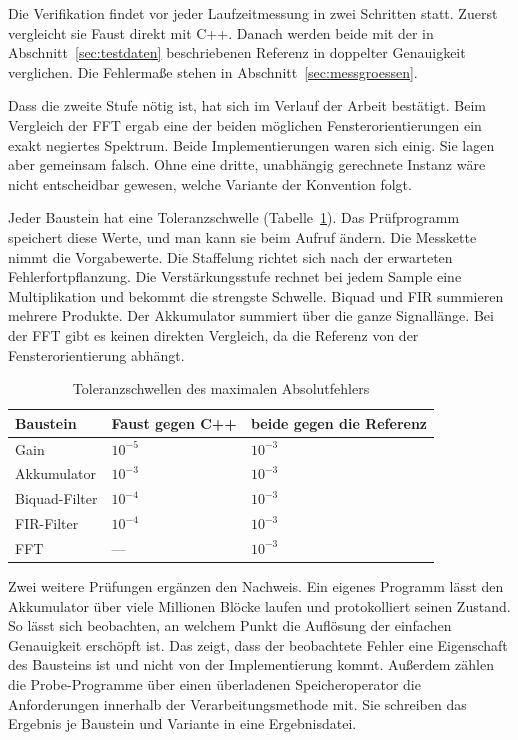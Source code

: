 Die Verifikation findet vor jeder Laufzeitmessung in zwei Schritten statt. Zuerst vergleicht sie Faust direkt mit C++. Danach werden beide mit der in Abschnitt~\ref{sec:testdaten} beschriebenen Referenz in doppelter Genauigkeit verglichen. Die Fehlermaße stehen in Abschnitt~\ref{sec:messgroessen}.

Dass die zweite Stufe nötig ist, hat sich im Verlauf der Arbeit bestätigt. Beim Vergleich der FFT ergab eine der beiden möglichen Fensterorientierungen ein exakt negiertes Spektrum. Beide Implementierungen waren sich einig. Sie lagen aber gemeinsam falsch. Ohne eine dritte, unabhängig gerechnete Instanz wäre nicht entscheidbar gewesen, welche Variante der Konvention folgt.

Jeder Baustein hat eine Toleranzschwelle (Tabelle~\ref{tab:toleranzen}). Das Prüfprogramm speichert diese Werte, und man kann sie beim Aufruf ändern. Die Messkette nimmt die Vorgabewerte. Die Staffelung richtet sich nach der erwarteten Fehlerfortpflanzung. Die Verstärkungsstufe rechnet bei jedem Sample eine Multiplikation und bekommt die strengste Schwelle. Biquad und FIR summieren mehrere Produkte. Der Akkumulator summiert über die ganze Signallänge. Bei der FFT gibt es keinen direkten Vergleich, da die Referenz von der Fensterorientierung abhängt.

\begin{table}[htb]
	\centering
	\small
	\caption{Toleranzschwellen des maximalen Absolutfehlers}
	\label{tab:toleranzen}
	\begin{tabular}{lll}
		\toprule
		Baustein & Faust gegen C++ & beide gegen die Referenz \\
		\midrule
		Gain          & $10^{-5}$ & $10^{-3}$ \\
		Akkumulator   & $10^{-3}$ & $10^{-3}$ \\
		Biquad-Filter & $10^{-4}$ & $10^{-3}$ \\
		FIR-Filter    & $10^{-4}$ & $10^{-3}$ \\
		FFT           & ---       & $10^{-3}$ \\
		\bottomrule
	\end{tabular}
\end{table}

Zwei weitere Prüfungen ergänzen den Nachweis. Ein eigenes Programm lässt den Akkumulator über viele Millionen Blöcke laufen und protokolliert seinen Zustand. So lässt sich beobachten, an welchem Punkt die Auflösung der einfachen Genauigkeit erschöpft ist. Das zeigt, dass der beobachtete Fehler eine Eigenschaft des Bausteins ist und nicht von der Implementierung kommt. Außerdem zählen die Probe-Programme über einen überladenen Speicheroperator die Anforderungen innerhalb der Verarbeitungsmethode mit. Sie schreiben das Ergebnis je Baustein und Variante in eine Ergebnisdatei.

